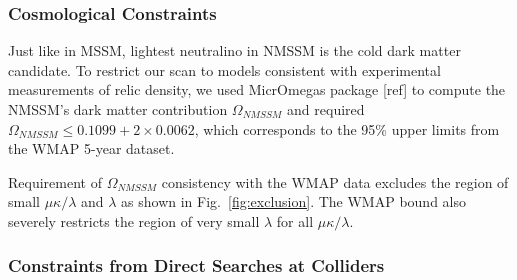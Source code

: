 \documentclass[aps,prl,twocolumn,nofootinbib,superscriptaddress]{revtex4}
\begin{document}



\subsubsection{Cosmological Constraints}

Just like in MSSM, lightest neutralino in NMSSM is the cold dark matter candidate.  
To restrict our scan to models consistent with experimental measurements of relic 
density, we used MicrOmegas package [ref] to compute the NMSSM's dark matter 
contribution $\Omega_{NMSSM}$ and required $\Omega_{NMSSM} \le 0.1099 + 2\times0.0062$,
which corresponds to the 95\% upper limits from the WMAP 5-year dataset. 

Requirement of $\Omega_{NMSSM}$ consistency with the WMAP data excludes the region of 
small $\mu\kappa/\lambda$ and $\lambda$ as shown in Fig.~\ref{fig:exclusion}. The 
WMAP bound also severely restricts the region of very small $\lambda$ for all $\mu\kappa/\lambda$.



\subsubsection{Constraints from Direct Searches at Colliders}
\end{document}
